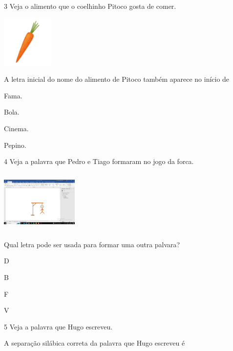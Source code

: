 \num{3} Veja o alimento que o coelhinho Pitoco gosta de comer.

\includegraphics[width=1.01111in,height=1.01111in]{media/image149.jpeg}


A letra inicial do nome do alimento de Pitoco também aparece no início de

\begin{escolha}
\item Fama.

\item Bola.

\item Cinema.

\item Pepino.
\end{escolha}

\num{4} Veja a palavra que Pedro e Tiago formaram no jogo da forca.

\includegraphics[width=1.50909in,height=1.22355in]{media/image150.png}

Qual letra pode ser usada para formar uma outra palvara?

\begin{escolha}
\item D

\item B

\item F

\item V
\end{escolha}

\num{5} Veja a palavra que Hugo escreveu.

A separação silábica correta da palavra que Hugo escreveu é

